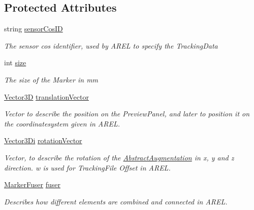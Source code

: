 \subsection*{Protected Attributes}
\begin{DoxyCompactItemize}
\item 
string \hyperlink{class_a_rdev_kit_1_1_model_1_1_project_1_1_abstract2_d_trackable_ac965f78edc7135b60377d14acbe6d358}{sensor\-Cos\-I\-D}
\begin{DoxyCompactList}\small\item\em The sensor cos identifier, used by A\-R\-E\-L to specify the Tracking\-Data \end{DoxyCompactList}\item 
int \hyperlink{class_a_rdev_kit_1_1_model_1_1_project_1_1_abstract2_d_trackable_a3ef9116db48c612d3428126786516e81}{size}
\begin{DoxyCompactList}\small\item\em The size of the Marker in mm \end{DoxyCompactList}\item 
\hyperlink{class_a_rdev_kit_1_1_model_1_1_project_1_1_vector3_d}{Vector3\-D} \hyperlink{class_a_rdev_kit_1_1_model_1_1_project_1_1_abstract2_d_trackable_a5d6e8cbc9efc6da689e3537d334fec37}{translation\-Vector}
\begin{DoxyCompactList}\small\item\em Vector to describe the position on the Preview\-Panel, and later to position it on the coordinatesystem given in A\-R\-E\-L. \end{DoxyCompactList}\item 
\hyperlink{class_a_rdev_kit_1_1_model_1_1_project_1_1_vector3_di}{Vector3\-Di} \hyperlink{class_a_rdev_kit_1_1_model_1_1_project_1_1_abstract2_d_trackable_a85997ab052b01f3680d47d199b4551a0}{rotation\-Vector}
\begin{DoxyCompactList}\small\item\em Vector, to describe the rotation of the \hyperlink{class_a_rdev_kit_1_1_model_1_1_project_1_1_abstract_augmentation}{Abstract\-Augmentation} in x, y and z direction. w is used for Tracking\-File Offset in A\-R\-E\-L. \end{DoxyCompactList}\item 
\hyperlink{class_a_rdev_kit_1_1_model_1_1_project_1_1_marker_fuser}{Marker\-Fuser} \hyperlink{class_a_rdev_kit_1_1_model_1_1_project_1_1_abstract2_d_trackable_a8ebdec7d02359310504e15f3a9852c04}{fuser}
\begin{DoxyCompactList}\small\item\em Describes how different elements are combined and connected in A\-R\-E\-L. \end{DoxyCompactList}\end{DoxyCompactItemize}
